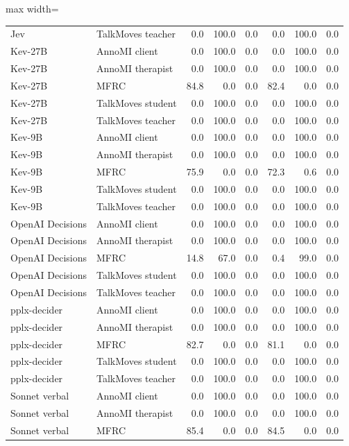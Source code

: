 \begin{table}[t]
\begin{adjustbox}{max width=\linewidth}
\begin{tabular}{llrrrrrr}
Jev & TalkMoves teacher & 0.0 & 100.0 & 0.0 & 0.0 & 100.0 & 0.0 \\
Kev-27B & AnnoMI client & 0.0 & 100.0 & 0.0 & 0.0 & 100.0 & 0.0 \\
Kev-27B & AnnoMI therapist & 0.0 & 100.0 & 0.0 & 0.0 & 100.0 & 0.0 \\
Kev-27B & MFRC & 84.8 & 0.0 & 0.0 & 82.4 & 0.0 & 0.0 \\
Kev-27B & TalkMoves student & 0.0 & 100.0 & 0.0 & 0.0 & 100.0 & 0.0 \\
Kev-27B & TalkMoves teacher & 0.0 & 100.0 & 0.0 & 0.0 & 100.0 & 0.0 \\
Kev-9B & AnnoMI client & 0.0 & 100.0 & 0.0 & 0.0 & 100.0 & 0.0 \\
Kev-9B & AnnoMI therapist & 0.0 & 100.0 & 0.0 & 0.0 & 100.0 & 0.0 \\
Kev-9B & MFRC & 75.9 & 0.0 & 0.0 & 72.3 & 0.6 & 0.0 \\
Kev-9B & TalkMoves student & 0.0 & 100.0 & 0.0 & 0.0 & 100.0 & 0.0 \\
Kev-9B & TalkMoves teacher & 0.0 & 100.0 & 0.0 & 0.0 & 100.0 & 0.0 \\
OpenAI Decisions & AnnoMI client & 0.0 & 100.0 & 0.0 & 0.0 & 100.0 & 0.0 \\
OpenAI Decisions & AnnoMI therapist & 0.0 & 100.0 & 0.0 & 0.0 & 100.0 & 0.0 \\
OpenAI Decisions & MFRC & 14.8 & 67.0 & 0.0 & 0.4 & 99.0 & 0.0 \\
OpenAI Decisions & TalkMoves student & 0.0 & 100.0 & 0.0 & 0.0 & 100.0 & 0.0 \\
OpenAI Decisions & TalkMoves teacher & 0.0 & 100.0 & 0.0 & 0.0 & 100.0 & 0.0 \\
pplx-decider & AnnoMI client & 0.0 & 100.0 & 0.0 & 0.0 & 100.0 & 0.0 \\
pplx-decider & AnnoMI therapist & 0.0 & 100.0 & 0.0 & 0.0 & 100.0 & 0.0 \\
pplx-decider & MFRC & 82.7 & 0.0 & 0.0 & 81.1 & 0.0 & 0.0 \\
pplx-decider & TalkMoves student & 0.0 & 100.0 & 0.0 & 0.0 & 100.0 & 0.0 \\
pplx-decider & TalkMoves teacher & 0.0 & 100.0 & 0.0 & 0.0 & 100.0 & 0.0 \\
Sonnet verbal & AnnoMI client & 0.0 & 100.0 & 0.0 & 0.0 & 100.0 & 0.0 \\
Sonnet verbal & AnnoMI therapist & 0.0 & 100.0 & 0.0 & 0.0 & 100.0 & 0.0 \\
Sonnet verbal & MFRC & 85.4 & 0.0 & 0.0 & 84.5 & 0.0 & 0.0 \\

\end{tabular}
\end{adjustbox}
\end{table}
